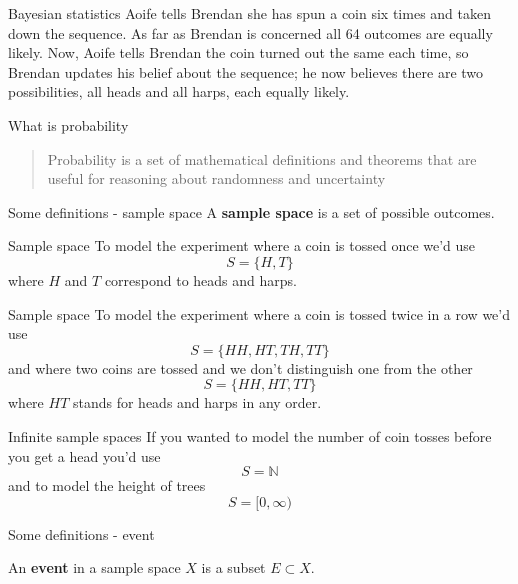 \documentclass{beamer}
\newcommand{\crish}{\color{reddish}}
\newcommand{\cbla}{\color{black}}
\newcommand{\cred}{\color{red}}
\newcommand{\cblu}{\color{blue}}
\begin{document}
\begin{frame}{Bayesian statistics}
  \cred{}Aoife\cbla{}  tells \cblu{}Brendan\cbla{}  she has spun a coin six times and taken down the
  sequence. As far as \cblu{}Brendan\cbla{}  is concerned all 64 outcomes are equally
  likely. Now, \cred{}Aoife\cbla{}  tells \cblu{}Brendan\cbla{}  the coin turned out the same each
  time, so \cblu{}Brendan\cbla{}  updates his belief about the sequence; he now
  believes there are two possibilities, all heads and all harps, each
  equally likely.
\end{frame}

\begin{frame}{What is probability}
  \begin{quote}
    Probability is a set of mathematical definitions and theorems that
    are useful for reasoning about randomness and uncertainty
  \end{quote}
\end{frame}

\begin{frame}{Some definitions - sample space}
  A \textbf{sample space} is a set of possible outcomes. 
\end{frame}

\begin{frame}{Sample space}
  To model the experiment where a coin is tossed once we'd use
  \crish$$S=\{H,T\}$$\cbla{}
  where \crish$H$\cbla{} and \crish$T$\cbla{} correspond to heads and harps.
\end{frame}


\begin{frame}{Sample space}
  To model the experiment where a coin is tossed twice in a row we'd use
  \crish$$S=\{HH,HT,TH,TT\}$$\cbla{}
  and where two coins are tossed and we don't distinguish one from the other
  \crish$$S=\{HH,HT,TT\}$$\cbla{}
  where \crish$HT$\cbla{} stands for heads and harps in any order.
\end{frame}

\begin{frame}{Infinite sample spaces}
  If you wanted to model the number of coin tosses before you get a head you'd use
  \crish$$S=\mathbb{N}$$\cbla{}
  and to model the height of trees
  \crish$$S=[0,\infty)$$\cbla{}
\end{frame}

\begin{frame}{Some definitions - event}

  An \textbf{event} in a sample space \crish$X$\cbla{} is a subset \crish$E\subset X$\cbla{}.

\end{frame}
\end{document}
